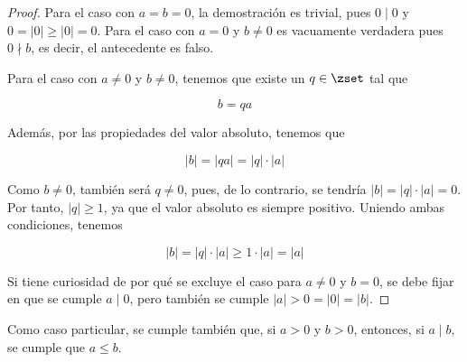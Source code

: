 \begin{proof}
  Para el caso con $a = b = 0$, la demostración es trivial, pues $0 \mid 0$
  y $0 = |0| \geq |0| = 0$. Para el caso con $a = 0$ y $b \neq 0$ es
  vacuamente verdadera pues $0 \nmid b$, es decir, el antecedente es falso.

  Para el caso con $a \neq 0$ y $b \neq 0$, tenemos que existe un $q \in
  \zset$ tal que

  $$ b = qa $$

  Además, por las propiedades del valor absoluto, tenemos que

  $$ |b| = |qa| = |q| \cdot |a| $$

  Como $b \neq 0$, también será $q \neq 0$, pues, de lo contrario, se
  tendría $|b| = |q| \cdot |a| = 0$. Por tanto, $|q| \geq 1$, ya que el
  valor absoluto es siempre positivo. Uniendo ambas condiciones, tenemos

  $$ |b| = |q| \cdot |a| \geq 1 \cdot |a| = |a| $$

  \iffalse

  Tomamos una variable $m$ a partir de $q$ tal que $m = q - 1$. Entonces,
  tenemos que

  $$ |b| = |m + 1| \cdot |a| $$

  Por la desigualdad triangular, se tiene que $|m + 1| \leq |m| + |1|$. Por
  tanto,

  $$ |b| = |m + 1| \cdot |a| \leq (|m| + 1) \, |a| = (|m| \cdot |a|) + |a|
  $$

  Como $|q| \geq 1$, tal y como dijimos antes, podemos ahora deducir que
  $|m| \geq 0$, aunque esto sería innecesario. Entonces, $|m| \cdot |a| \geq
  0$. Y esto es la definición de ``mayor o igual que''. Por tanto, se
  cumplirá $|b| \geq |a|$.
  \fi

  Si tiene curiosidad de por qué se excluye el caso para $a \neq 0$ y $b =
  0$, se debe fijar en que se cumple $a \mid 0$, pero también se cumple $|a|
  > 0 = |0| = |b|$.
\end{proof}

Como caso particular, se cumple también que, si $a > 0$ y $b > 0$, entonces,
si $a \mid b$, se cumple que $a \leq b$.














